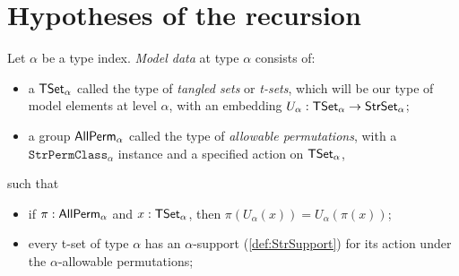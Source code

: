 \section{Hypotheses of the recursion}
\begin{definition}
  \label{def:ModelData}
  Let \( \alpha \) be a type index.
  \emph{Model data} at type \( \alpha \) consists of:
  \begin{itemize}
    \item a \( \mathsf{TSet}_\alpha \) called the type of \emph{tangled sets} or \emph{t-sets}, which will be our type of model elements at level \( \alpha \), with an embedding \( U_\alpha : \mathsf{TSet}_\alpha \to \mathsf{StrSet}_\alpha \);
    \item a group \( \mathsf{AllPerm}_\alpha \) called the type of \emph{allowable permutations}, with a \( \texttt{StrPermClass}_\alpha \) instance and a specified action on \( \mathsf{TSet}_\alpha \),
  \end{itemize}
  such that
  \begin{itemize}
    \item if \( \pi : \mathsf{AllPerm}_\alpha \) and \( x : \mathsf{TSet}_\alpha \), then \( \pi(U_\alpha(x)) = U_\alpha(\pi(x)) \);
    \item every t-set of type \( \alpha \) has an \( \alpha \)-support (\cref{def:StrSupport}) for its action under the \( \alpha \)-allowable permutations;
  \end{itemize}
\end{definition}
